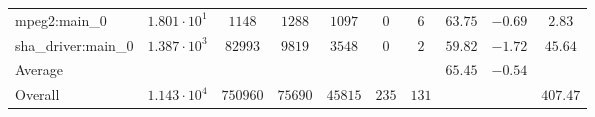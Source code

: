 \begin{tabular}{|l|c|c|c|c|c|c|c|c|c|}
mpeg2:main\_0           & $ 1.801 \cdot 10^{1} $ & $ 1148   $ & $ 1288  $ & $ 1097  $ & $ 0   $ & $ 6   $ & $ 63.75       $ & $ -0.69   $ & $ 2.83    $ \\
sha\_driver:main\_0     & $ 1.387 \cdot 10^{3} $ & $ 82993  $ & $ 9819  $ & $ 3548  $ & $ 0   $ & $ 2   $ & $ 59.82       $ & $ -1.72   $ & $ 45.64   $ \\
\hline
Average                 & $                    $ & $        $ & $       $ & $       $ & $     $ & $     $ & $ 65.45       $ & $ -0.54   $ & $         $ \\
\hline
Overall                 & $ 1.143 \cdot 10^{4} $ & $ 750960 $ & $ 75690 $ & $ 45815 $ & $ 235 $ & $ 131 $ & $             $ & $         $ & $ 407.47  $ \\
\hline
\end{tabular}

